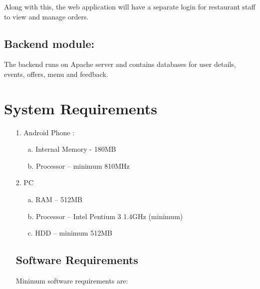 Along with this, the web application will have a separate login for restaurant staff to view and manage orders.

\subsection{Backend module:}

The backend runs on Apache server and contains databases for user details, events, offers, menu and feedback.


\section{System Requirements}
\begin{itemize}

\subsection{Hardware Requirements:}

\item[1.] Android Phone :


\begin{itemize}

\item[a.]	Internal Memory  - 180MB

\item[b.]	Processor –	minimum 810MHz
\end{itemize}



\item[2.] PC

\begin{itemize}

\item[a.] RAM –	512MB

\item[b.] Processor – Intel Pentium 3 1.4GHz (minimum)

\item[c.] HDD –	minimum 512MB

\end{itemize}




\subsection{Software Requirements}

Minimum software requirements are:

\begin{itemize}


\end{itemize}
\end{itemize}
